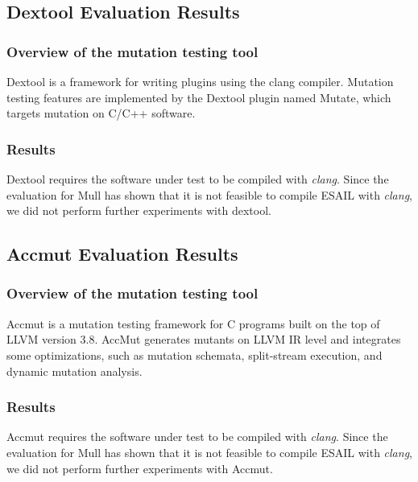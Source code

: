 

\subsection{Dextool Evaluation Results}
\label{subsec:dextool}

\subsubsection{Overview of the mutation testing tool}

Dextool is a framework for writing plugins using the clang compiler. Mutation testing features are implemented by the Dextool plugin named Mutate, which targets mutation on C/C++ software.

\subsubsection{Results}

Dextool requires the software under test to be compiled with \emph{clang}.
Since the evaluation for Mull has shown that it is not feasible to compile ESAIL with \emph{clang}, we did not perform further experiments with dextool.



\subsection{Accmut Evaluation Results}
\label{subsec:dextool}

\subsubsection{Overview of the mutation testing tool}

Accmut is a mutation testing framework for C programs built on the top of LLVM version 3.8. AccMut generates mutants on LLVM IR level and integrates some optimizations, such as mutation schemata, split-stream execution, and dynamic mutation analysis.

\subsubsection{Results}

Accmut requires the software under test to be compiled with \emph{clang}.
Since the evaluation for Mull has shown that it is not feasible to compile ESAIL with \emph{clang}, we did not perform further experiments with Accmut.


